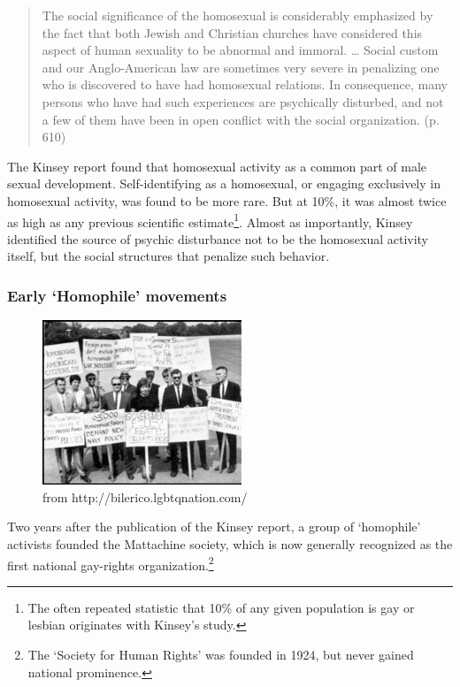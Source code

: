 \begin{quote}

The social significance of the homosexual is considerably emphasized by the fact that both Jewish and Christian churches have considered this aspect of human sexuality to be abnormal and immoral. … Social custom and our Anglo-American law are sometimes very severe in penalizing one who is discovered to have had homosexual relations. In consequence, many persons who have had such experiences are psychically disturbed, and not a few of them have been in open conflict with the social organization. (p. 610)
\end{quote}

The Kinsey report found that homosexual activity as a common part of male sexual development. Self-identifying as a homosexual, or engaging exclusively in homosexual activity, was found to be more rare. But at 10\%, it was almost twice as high as any previous scientific estimate\footnote{The often repeated statistic that 10\% of any given population is gay or lesbian originates with Kinsey’s study.}. Almost as importantly, Kinsey identified the source of psychic disturbance not to be the homosexual activity itself, but the social structures that penalize such behavior.

\subsubsection{Early `Homophile' movements}
\label{earlyhomophilemovements}

\begin{figure}[h]
 \centering

     \includegraphics{../images/1965-gay-Picket-thumb-225x186-17508.png}
 \caption{from http://bilerico.lgbtqnation.com/}
\label{fig: 1965Picket}
\end{figure}


Two years after the publication of the Kinsey report, a group of `homophile' activists founded the Mattachine society, which is now generally recognized as the first national gay-rights organization.\footnote{The `Society for Human Rights' was founded in 1924, but never gained national prominence.}

